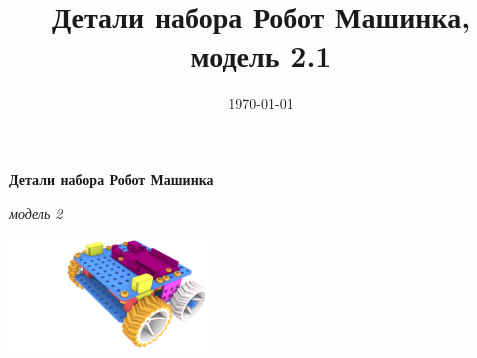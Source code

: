 \documentclass[twoside,a5paper,8pt]{article}
\title{Детали набора Робот Машинка, модель 2.1} %
\date{\today} %
\begin{document}
  \begin{center}
    \textbf{Детали набора Робот Машинка}
  \end{center}
  \begin{flushright}
    \emph{модель 2}
  \end{flushright}
   
  \begin{flushright}
    \includegraphics[height=30mm]{fig/model2-render05.png}   
  \end{flushright}
  
   
\end{document}
